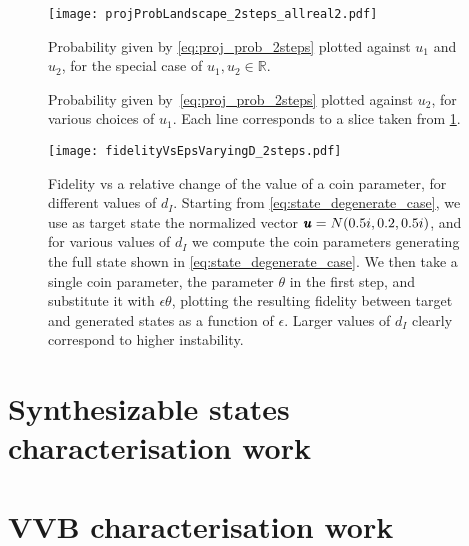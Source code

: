 \begin{figure}[tb]
	\centering
	\texttt{[image: projProbLandscape\_2steps\_allreal2.pdf]}
	\caption{
		Probability given by \cref{eq:proj_prob_2steps} plotted against $u_1$ and $u_2$, for the special case of $u_1, u_2 \in \mathbb R$.
	}
	\label{fig:proj_prob_landscape_plot3d}
\end{figure}
\begin{figure}[tb]
	\centering
	\caption{
		Probability given by~\cref{eq:proj_prob_2steps} plotted against $u_2$, for various choices of $u_1$.
		Each line corresponds to a slice taken from \cref{fig:proj_prob_landscape_plot3d}.}
	\label{fig:proj_prob_landscape_slices}
\end{figure}
\begin{figure}[tb]
	\centering
	\texttt{[image: fidelityVsEpsVaryingD\_2steps.pdf]}
	\caption{
		Fidelity vs a relative change of the value of a coin parameter, for different values of $d_I$.
		Starting from \cref{eq:state_degenerate_case}, we use as target state the normalized vector
		$\pmb{u} = N (0.5 i, 0.2, 0.5 i)$, and for various values of $d_I$ we compute the coin parameters generating the full state shown in \cref{eq:state_degenerate_case}.
		We then take a single coin parameter, the parameter $\theta$ in the first step, and substitute it with $\epsilon \theta$, plotting the resulting fidelity between target and generated states as a function of $\epsilon$.
		Larger values of $d_I$ clearly correspond to higher instability.
	}
	\label{fig:fid_vs_eps_varying_d}
\end{figure}

\section{Synthesizable states characterisation work}
\section{VVB characterisation work}


